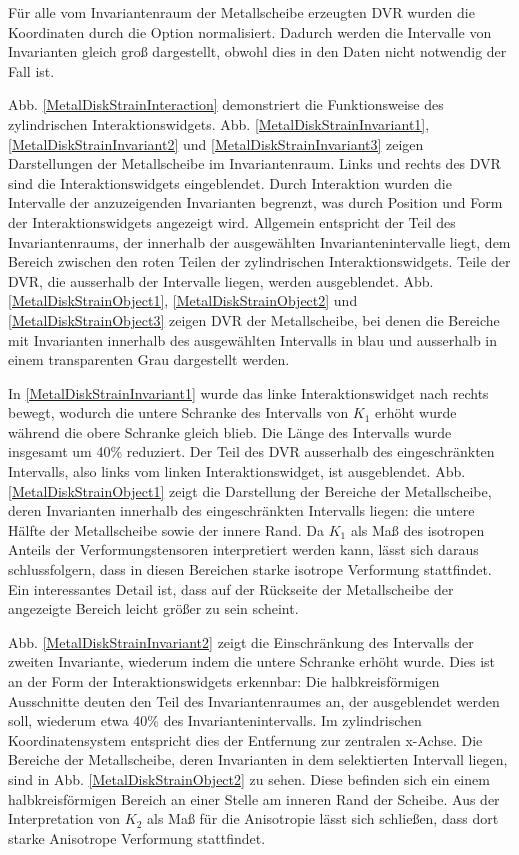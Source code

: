 \documentclass[a4paper,fontsize=12pt,toc=bib,halfparskip]{scrartcl}
\begin{document}
F\"ur alle vom Invariantenraum der Metallscheibe erzeugten DVR wurden die Koordinaten durch die Option normalisiert. Dadurch werden die Intervalle von Invarianten gleich gro{\ss} dargestellt, obwohl dies in den Daten nicht notwendig der Fall ist.

Abb. \ref{MetalDiskStrainInteraction} demonstriert die Funktionsweise des zylindrischen Interaktionswidgets. Abb. \ref{MetalDiskStrainInvariant1}, \ref{MetalDiskStrainInvariant2} und \ref{MetalDiskStrainInvariant3} zeigen Darstellungen der Metallscheibe im Invariantenraum. Links und rechts des DVR sind die Interaktionswidgets eingeblendet. Durch Interaktion wurden die Intervalle der anzuzeigenden Invarianten begrenzt, was durch Position und Form der Interaktionswidgets angezeigt wird. Allgemein entspricht der Teil des Invariantenraums, der innerhalb der ausgew\"ahlten Invariantenintervalle liegt, dem Bereich zwischen den roten Teilen der zylindrischen Interaktionswidgets. Teile der DVR, die ausserhalb der Intervalle liegen, werden ausgeblendet. Abb. \ref{MetalDiskStrainObject1}, \ref{MetalDiskStrainObject2} und \ref{MetalDiskStrainObject3} zeigen DVR der Metallscheibe, bei denen die Bereiche mit Invarianten innerhalb des ausgew\"ahlten Intervalls in blau und ausserhalb in einem transparenten Grau dargestellt werden.

In \ref{MetalDiskStrainInvariant1} wurde das linke Interaktionswidget nach rechts bewegt, wodurch die untere Schranke des Intervalls von $K_1$ erh\"oht wurde w\"ahrend die obere Schranke gleich blieb. Die L\"ange des Intervalls wurde insgesamt um 40\% reduziert. Der Teil des DVR ausserhalb des eingeschr\"ankten Intervalls, also links vom linken Interaktionswidget, ist ausgeblendet. Abb. \ref{MetalDiskStrainObject1} zeigt die Darstellung der Bereiche der Metallscheibe, deren Invarianten innerhalb des eingeschr\"ankten Intervalls liegen: die untere H\"alfte der Metallscheibe sowie der innere Rand. Da $K_1$ als Ma{\ss} des isotropen Anteils der Verformungstensoren interpretiert werden kann, l\"asst sich daraus schlussfolgern, dass in diesen Bereichen starke isotrope Verformung stattfindet. Ein interessantes Detail ist, dass auf der R\"uckseite der Metallscheibe der angezeigte Bereich leicht gr\"o{\ss}er zu sein scheint.

Abb. \ref{MetalDiskStrainInvariant2} zeigt die Einschr\"ankung des Intervalls der zweiten Invariante, wiederum indem die untere Schranke erh\"oht wurde. Dies ist an der Form der Interaktionswidgets erkennbar: Die halbkreisf\"ormigen Ausschnitte deuten den Teil des Invariantenraumes an, der ausgeblendet werden soll, wiederum etwa 40\% des Invariantenintervalls.  Im zylindrischen Koordinatensystem entspricht dies der Entfernung zur zentralen x-Achse. Die Bereiche der Metallscheibe, deren Invarianten in dem selektierten Intervall liegen, sind in Abb. \ref{MetalDiskStrainObject2} zu sehen. Diese befinden sich ein einem halbkreisf\"ormigen Bereich an einer Stelle am inneren Rand der Scheibe. Aus der Interpretation von $K_2$ als Ma{\ss} f\"ur die Anisotropie l\"asst sich schlie{\ss}en, dass dort starke Anisotrope Verformung stattfindet.
\end{document}
